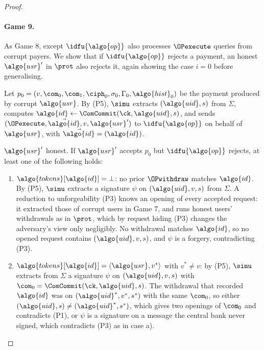 \begin{proof}
\paragraph{Game 9.} As Game 8, except $\idfu{\algo{op}}$ also processes
$\OPexecute$ queries from corrupt payers. We show that if $\idfu{\algo{op}}$
rejects a payment, an honest $\algo{usr}'$ in $\prot$ also rejects it,
again showing the case $i = 0$ before generalising.

Let $p_0 = (v, \com_0, \com_1, \ciph_0, \sigma_0, \Gamma_0, \algo{hist}_0)$ be
the payment produced by corrupt $\algo{usr}$. By (P5), $\simu$ extracts
$(\algo{uid}, s)$ from $\Sigma$, computes $\algo{id} \leftarrow \ComCommit(\ck,\allowbreak
\algo{uid},\allowbreak s)$, and sends $(\OPexecute, \vec{\algo{id}}, v,
\algo{usr}')$ to $\idfu{\algo{op}}$ on behalf of $\algo{usr}$, with
$\vec{\algo{id}} = (\algo{id})$.

$\algo{usr}'$ honest. If $\algo{usr}'$ accepts $p_0$ but $\idfu{\algo{op}}$
rejects, at least one of the following holds:

\begin{enumerate}[label=\alph*)]

  \item $\algo{tokens}[\algo{id}] = \bot$: no prior $\OPwithdraw$ matches $\algo{id}$. By
(P5), $\simu$ extracts a signature $\psi$ on $(\algo{uid}, v, s)$ from
$\Sigma$. A reduction to unforgeability (P3) knows an opening of every accepted
request: it extracted those of corrupt users in Game 7, and runs honest users'
withdrawals as in $\prot$, which by request hiding (P3) changes the adversary's
view only negligibly. No withdrawal matches $\algo{id}$, so no opened request
contains $(\algo{uid}, v, s)$, and $\psi$ is a forgery, contradicting (P3).

  \item $\algo{tokens}[\algo{id}] = \langle \algo{usr}, v^* \rangle$ with $v^* \neq
v$: by (P5), $\simu$ extracts from $\Sigma$ a signature $\psi$ on $(\algo{uid},
v, s)$ with $\com_0 = \ComCommit(\ck, \algo{uid}, s)$. The withdrawal that
recorded $\algo{id}$ was on $(\algo{uid}^*, v^*, s^*)$ with the same $\com_0$, so
either $(\algo{uid}, s) \neq (\algo{uid}^*, s^*)$, which gives two openings of
$\com_0$ and contradicts (P1), or $\psi$ is a signature on a message the central
bank never signed, which contradicts (P3) as in case a).


\end{enumerate}
\end{proof}
